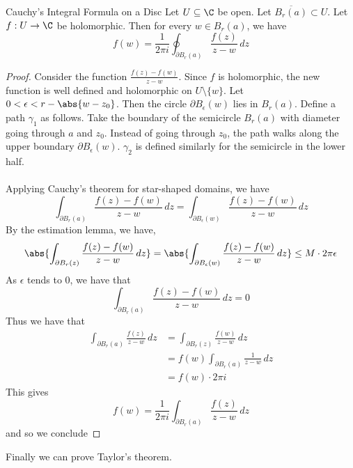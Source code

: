 \documentclass[a4paper]{article}
\begin{document}
\begin{thm}{Cauchy's Integral Formula on a Disc}{} Let $U\subseteq\C$ be open. Let $\overline{B_r(a)}\subset U$. Let $f:U\to\C$ be holomorphic. Then for every $w\in B_r(a)$, we have $$f(w)=\frac{1}{2\pi i}\oint_{\partial B_r(a)}\frac{f(z)}{z-w}\,dz$$ \tcbline
\begin{proof}
Consider the function $\frac{f(z)-f(w)}{z-w}$. Since $f$ is holomorphic, the new function is well defined and holomorphic on $U\setminus\{w\}$. Let $0<\epsilon<r-\abs{w-z_0}$. Then the circle $\partial B_\epsilon(w)$ lies in $B_r(a)$. Define a path $\gamma_1$ as follows. Take the boundary of the semicircle $B_r(a)$ with diameter going through $a$ and $z_0$. Instead of going through $z_0$, the path walks along the upper boundary $\partial B_\epsilon(w)$. $\gamma_2$ is defined similarly for the semicircle in the lower half. \\~\\

Applying Cauchy's theorem for star-shaped domains, we have $$\int_{\partial B_r(a)}\frac{f(z)-f(w)}{z-w}\,dz=\int_{\partial B_\epsilon(w)}\frac{f(z)-f(w)}{z-w}\,dz$$ By the estimation lemma, we have, $$\abs{\int_{\partial B_r(z)}\frac{f(z)-f(w)}{z-w}\,dz}=\abs{\int_{\partial B_\epsilon(w)}\frac{f(z)-f(w)}{z-w}\,dz}\leq M\cdot 2\pi\epsilon$$ As $\epsilon$ tends to $0$, we have that $$\int_{\partial B_r(a)}\frac{f(z)-f(w)}{z-w}\,dz=0$$ Thus we have that 
\begin{align*}
\int_{\partial B_r(a)}\frac{f(z)}{z-w}\,dz&=\int_{\partial B_r(z)}\frac{f(w)}{z-w}\,dz\\
&=f(w)\int_{\partial B_r(a)}\frac{1}{z-w}\,dz\\
&=f(w)\cdot 2\pi i
\end{align*} This gives $$f(w)=\frac{1}{2\pi i}\int_{\partial B_r(a)}\frac{f(z)}{z-w}\,dz$$ and so we conclude
\end{proof}
\end{thm}

Finally we can prove Taylor's theorem. 
\end{document}
